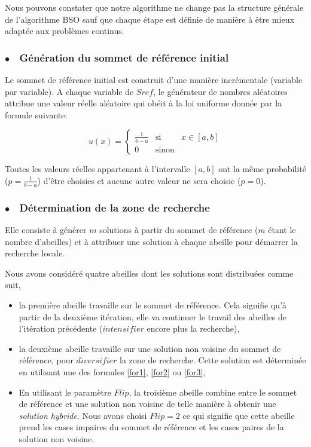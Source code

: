 \bigskip

Nous pouvons constater que notre algorithme ne change pas la structure générale de l'algorithme BSO sauf que chaque étape est définie de manière à être mieux adaptée aux problèmes continus.

\subsubsection{$\bullet\quad$Génération du sommet de référence initial}
\begin{spacing}{1.6}
Le sommet de référence initial est construit d'une manière incrémentale (variable par variable). A chaque variable de $Sref$, le générateur de
nombres aléatoires attribue une valeur réelle aléatoire qui obéit à la loi uniforme donnée par la formule suivante:

\begin{equation}
u(x) = \left\{ \begin{array}{rcl}
	\frac{1}{b-a} & \mbox{si}
	& x\in [a,b] \\ 0 & \mbox{sinon}
\end{array}\right.\label{eq2}
\end{equation}


Toutes les valeurs réelles appartenant à l'intervalle $[a,b]$ ont la même probabilité ($p=\frac{1}{b-a}$) d'être choisies et aucune autre valeur ne sera choisie ($p=0$).\\

\subsubsection{$\bullet\quad$Détermination de la zone de recherche}
Elle consiste à générer $m$ solutions à partir du sommet de référence ($m$ étant le nombre d'abeilles) et à attribuer une solution à chaque abeille pour démarrer la recherche locale.

Nous avons considéré quatre abeilles dont les solutions sont distribuées comme suit,

\begin{itemize}
	\item la première abeille travaille sur le sommet de référence. Cela signifie qu'à partir de la deuxième itération, elle va continuer le travail des abeilles de l'itération précédente ($intensifier$ encore plus la recherche),
	\item la deuxième abeille travaille sur une solution non voisine du sommet de référence, pour $diversifier$ la zone de recherche. Cette solution est déterminée en utilisant une des formules \ref{for1}, \ref{for2} ou \ref{for3},
	\item En utilisant le paramètre $Flip$, la troisième abeille combine entre le sommet de référence et une solution non voisine de telle manière à obtenir une \emph{solution hybride}. Nous avons choisi $Flip=2$ ce qui signifie que cette abeille prend les cases impaires du sommet de référence et les cases paires de la solution non voisine.
	

\end{itemize}
\end{spacing}
